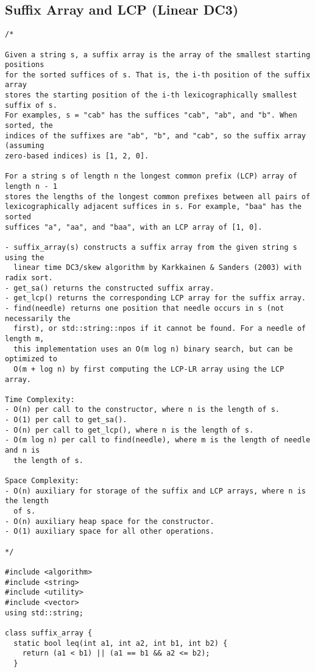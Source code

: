 \subsection{Suffix Array and LCP (Linear DC3)}
\begin{lstlisting}
/*

Given a string s, a suffix array is the array of the smallest starting positions
for the sorted suffices of s. That is, the i-th position of the suffix array
stores the starting position of the i-th lexicographically smallest suffix of s.
For examples, s = "cab" has the suffices "cab", "ab", and "b". When sorted, the
indices of the suffixes are "ab", "b", and "cab", so the suffix array (assuming
zero-based indices) is [1, 2, 0].

For a string s of length n the longest common prefix (LCP) array of length n - 1
stores the lengths of the longest common prefixes between all pairs of
lexicographically adjacent suffices in s. For example, "baa" has the sorted
suffices "a", "aa", and "baa", with an LCP array of [1, 0].

- suffix_array(s) constructs a suffix array from the given string s using the
  linear time DC3/skew algorithm by Karkkainen & Sanders (2003) with radix sort.
- get_sa() returns the constructed suffix array.
- get_lcp() returns the corresponding LCP array for the suffix array.
- find(needle) returns one position that needle occurs in s (not necessarily the
  first), or std::string::npos if it cannot be found. For a needle of length m,
  this implementation uses an O(m log n) binary search, but can be optimized to
  O(m + log n) by first computing the LCP-LR array using the LCP array.

Time Complexity:
- O(n) per call to the constructor, where n is the length of s.
- O(1) per call to get_sa().
- O(n) per call to get_lcp(), where n is the length of s.
- O(m log n) per call to find(needle), where m is the length of needle and n is
  the length of s.

Space Complexity:
- O(n) auxiliary for storage of the suffix and LCP arrays, where n is the length
  of s.
- O(n) auxiliary heap space for the constructor.
- O(1) auxiliary space for all other operations.

*/

#include <algorithm>
#include <string>
#include <utility>
#include <vector>
using std::string;

class suffix_array {
  static bool leq(int a1, int a2, int b1, int b2) {
    return (a1 < b1) || (a1 == b1 && a2 <= b2);
  }


\end{lstlisting}
